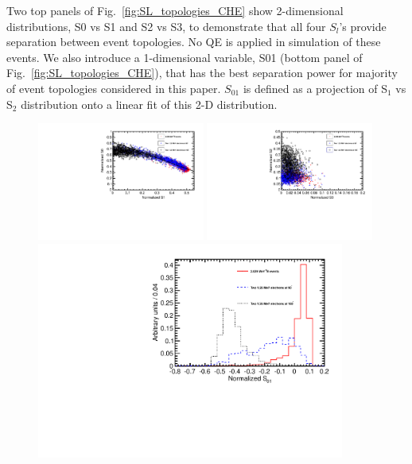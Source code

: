 \documentclass[12pt,twoside,letterpaper]{article}
\begin{document}
Two top panels of Fig.~\ref{fig:SL_topologies_CHE} show 2-dimensional distributions, S0 vs S1 and S2 vs S3, to demonstrate that all four $S_l$'s provide separation between event topologies. No QE is applied in simulation of these events. We also introduce a 1-dimensional variable, S01 (bottom panel of Fig.~\ref{fig:SL_topologies_CHE}), that has the best separation power for majority of event topologies considered in this paper. $S_{01}$ is defined as a projection of S$_1$ vs S$_2$ distribution onto a linear fit of this 2-D distribution.

\begin{figure}[htb]
\centering
\includegraphics[angle=0,width=0.49\textwidth]{plots/ALL/hS0vsS1_topologies_CHELight_VtxSmear0cm_VtxShiftX0cm_33p5ns_center.pdf}
\includegraphics[angle=0,width=0.49\textwidth]{plots/ALL/hS2vsS3_topologies_CHELight_VtxSmear0cm_VtxShiftX0cm_33p5ns_center.pdf}
\includegraphics[angle=0,width=0.9\textwidth]{plots/ALL/hS01_topologies_CHELight_VtxSmear0cm_VtxShiftX0cm_33p5ns_center.pdf}

\end{figure}
\end{document}
